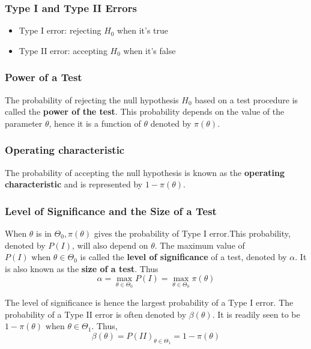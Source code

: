 \documentclass{article}
\begin{document}
\subsubsection{Type I and Type II Errors}
\begin{itemize}
    \item Type I error: rejecting \(H_0\) when it's true
    \item Type II error: accepting \(H_0\) when it's false
\end{itemize}

\subsubsection{Power of a Test}

The probability of rejecting the null hypothesis \(H_0\) based on a test procedure is called the \textbf{power of the test}. This probability depends on the value of the parameter \(\theta\), hence it is a function of \(\theta\) denoted by \(\pi(\theta)\).

\subsubsection{Operating characteristic}

The probability of accepting the null hypothesis is known as the \textbf{operating characteristic} and is represented by \(1-\pi(\theta)\).

\subsubsection{Level of Significance and the Size of a Test}

When \(\theta\) is in \(\Theta_0, \pi(\theta)\) gives the probability of Type I error.This probability, denoted by \(P(I)\), will also depend on $\theta$. The maximum value of \(P(I) \text{ when } \theta \in \Theta_0\) is called the  \textbf{level of significance} of a test, denoted by $\alpha$. It is also known as the \textbf{size of a test}. Thus
\begin{equation*}
    \alpha = \max_{\theta \in \Theta_0} P(I)=\max_{\theta \in \Theta_0} \pi(\theta)
\end{equation*}

The level of significance is hence the largest probability of a Type I error. The probability of a Type II error is often denoted by $\beta(\theta)$. It is readily seen to be \(1-\pi(\theta) \text{ when } \theta \in \Theta_1\). Thus,
\begin{equation*}
    \beta(\theta)=P(II)_{\theta \in \Theta_1}=1-\pi(\theta)
\end{equation*}
\end{document}
